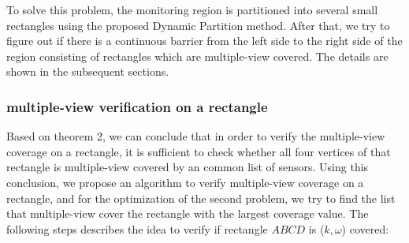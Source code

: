 To solve this problem, the monitoring region is partitioned into several small rectangles using the proposed Dynamic Partition method. After that, we try to figure out if there is a continuous barrier from the left side to the right side of the region consisting of rectangles which are multiple-view covered. The details are shown in the subsequent sections.

\subsubsection{multiple-view verification on a rectangle}
\label{subsec:01}
Based on theorem 2, we can conclude that in order to verify the multiple-view coverage on a rectangle, it is sufficient to check whether all four vertices of that rectangle is multiple-view covered by an common list of sensors. Using this conclusion, we propose an algorithm to verify multiple-view coverage on a rectangle, and for the optimization of the second problem, we try to find the list that multiple-view cover the rectangle with the largest coverage value. 
The following steps describes the idea to verify if rectangle $ABCD$ is ($k,\omega$) covered:
